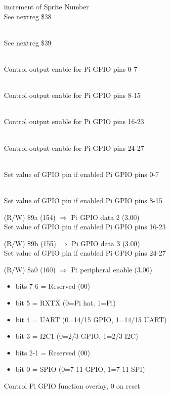 increment of Sprite Number\\
See nextreg \$38

\\
See nextreg \$39

\\
Control output enable for Pi GPIO pins 0-7

\\
Control output enable for Pi GPIO pins 8-15

\\
Control output enable for Pi GPIO pins 16-23

\\
Control output enable for Pi GPIO pins 24-27

\\
Set value of GPIO pin if enabled Pi GPIO pins 0-7

\\
Set value of GPIO pin if enabled Pi GPIO pins 8-15

(R/W) \$9a (154) $\Rightarrow$ Pi GPIO data 2 (3.00)\\
Set value of GPIO pin if enabled Pi GPIO pins 16-23

(R/W) \$9b (155) $\Rightarrow$ Pi GPIO data 3 (3.00)\\
Set value of GPIO pin if enabled Pi GPIO pins 24-27

(R/W) \$a0 (160) $\Rightarrow$ Pi peripheral enable (3.00)
\begin{itemize}
\item bits 7-6 = Reserved (00)
\item bit 5 = RXTX (0=Pi hat, 1=Pi)
\item bit 4 = UART (0=14/15 GPIO, 1=14/15 UART)
\item bit 3 = I2C1 (0=2/3 GPIO, 1=2/3 I2C)
\item bits 2-1 = Reserved (00)
\item bit 0 = SPIO (0=7-11 GPIO, 1=7-11 SPI)
\end{itemize}
Control Pi GPIO function overlay, 0 on reset

